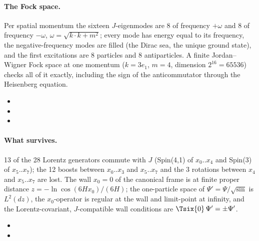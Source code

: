 \paragraph{The Fock space.} Per spatial momentum the sixteen $J$-eigenmodes are 8 of frequency
$+\omega$ and 8 of frequency $-\omega$, $\omega=\sqrt{k\cdot k+m^2}$; every mode has energy equal to its
frequency, the negative-frequency modes are filled (the Dirac sea, the unique ground state), and the
first excitations are 8 particles and 8 antiparticles. A finite Jordan--Wigner Fock space at one
momentum ($k=3e_1$, $m=4$, dimension $2^{16}=65536$) checks all of it exactly, including the sign of
the anticommutator through the Heisenberg equation. 
\begin{itemize}
  \item {}
  \item {}
  \item {}
\end{itemize}

\paragraph{What survives.} 13 of the 28 Lorentz generators commute with $J$ (Spin(4,1) of $x_0..x_4$
and Spin(3) of $x_5..x_7$); the 12 boosts between $x_0..x_3$ and $x_5..x_7$ and the 3 rotations between
$x_4$ and $x_5..x_7$ are lost. The wall $x_0=0$ of the canonical frame is at finite proper distance
$z=-\ln\cos(6Hx_0)/(6H)$; the one-particle space of $\Psi'=\Psi/\sqrt{\sin}$ is $L^2(dz)$, the
$x_0$-operator is regular at the wall and limit-point at infinity, and the Lorentz-covariant,
$J$-compatible wall conditions are $\Tsix{0}\,\Psi'=\pm\Psi'$. 
\begin{itemize}
  \item {}
  \item {}
\end{itemize}


